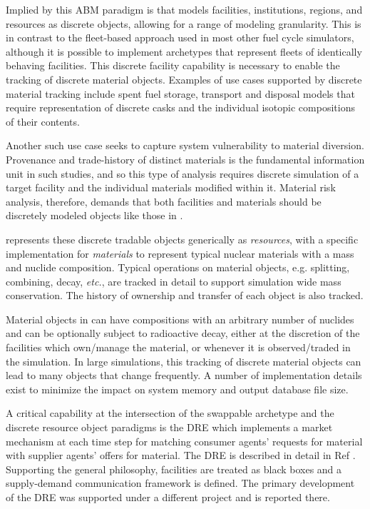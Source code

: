 Implied by this \gls{ABM} paradigm is that \Cyclus models facilities,
institutions, regions, and resources as discrete objects, allowing for a range
of modeling granularity.  This is in contrast to the fleet-based approach used
in most other fuel cycle simulators, although it is possible to implement
\Cyclus archetypes that represent fleets of identically behaving
facilities.  This discrete facility capability is
necessary to enable the tracking of discrete material objects.  Examples of
use cases supported by discrete material tracking include spent fuel storage,
transport and disposal models that require representation of discrete casks
and the individual isotopic compositions of their contents.

Another such use case seeks to capture system vulnerability to material
diversion. Provenance and trade-history of distinct materials is the
fundamental information unit in such studies, and so this type of analysis
requires discrete simulation of a target facility and the individual materials
modified within it.  Material risk analysis, therefore, demands that both
facilities and materials should be discretely modeled objects like those in
\Cyclus.

\Cyclus represents these discrete tradable objects generically as
\textit{resources}, with a specific implementation for \textit{materials} to
represent typical nuclear materials with a mass and nuclide composition.
Typical operations on material objects, e.g. splitting, combining, decay,
\emph{etc.}, are tracked in detail to support simulation wide mass
conservation.  The history of ownership and transfer of each object is also
tracked.

Material objects in \Cyclus can have compositions with an arbitrary number of
nuclides and can be optionally subject to radioactive decay, either at the
discretion of the facilities which own/manage the material, or whenever it is
observed/traded in the simulation.  In large simulations, this tracking of
discrete material objects can lead to many objects that change frequently.  A
number of implementation details exist to minimize the impact on system memory
and output database file size.

A critical capability at the intersection of the swappable archetype and the
discrete resource object paradigms is the \gls{DRE} which implements a market
mechanism at each time step for matching consumer agents' requests for
material with supplier agents' offers for material.  The \gls{DRE} is
described in detail in Ref \cite{gidden_agent-based_2015}.  Supporting the
general \Cyclus philosophy, facilities are treated as black boxes and a
supply-demand communication framework is defined.  The primary development of
the \gls{DRE} was supported under a different project and is reported
there\cite{cyclus-opt-report}.

